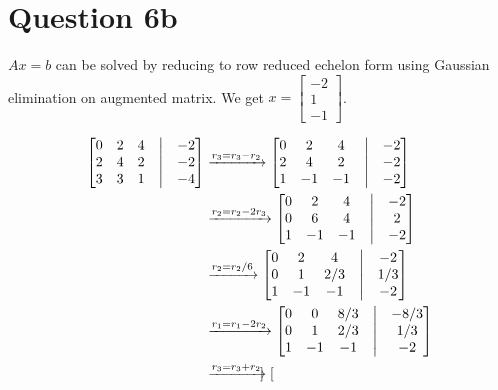 \documentclass{article}
\begin{document}
    \section*{Question 6b}
    $Ax = b$ can be solved by reducing to row reduced echelon form using Gaussian elimination on augmented matrix. We get $x = \begin{bmatrix} -2 \\ 1 \\ -1 \end{bmatrix}$.

    \begin{align*}
        \begin{bmatrix}
            0 & 2 & 4 &\bigm| & -2 \\
            2 & 4 & 2 &\bigm| & -2 \\
            3 & 3 & 1 &\bigm| & -4
        \end{bmatrix}
        &\xrightarrow{r_3 = r_3 - r_2}
        \begin{bmatrix}
            0 & 2 & 4 &\bigm| & -2 \\
            2 & 4 & 2 &\bigm| & -2 \\
            1 & -1 & -1 &\bigm| & -2
        \end{bmatrix} \\
        &\xrightarrow{r_2 = r_2 - 2r_3}
        \begin{bmatrix}
            0 & 2 & 4 &\bigm| & -2 \\
            0 & 6 & 4 &\bigm| & 2 \\
            1 & -1 & -1 &\bigm| & -2
        \end{bmatrix} \\
        &\xrightarrow{r_2 = r_2/6}
        \begin{bmatrix}
            0 & 2 & 4 &\bigm| & -2 \\
            0 & 1 & 2/3 &\bigm| & 1/3 \\
            1 & -1 & -1 &\bigm| & -2
        \end{bmatrix} \\
        &\xrightarrow{r_1 = r_1 - 2r_2}
        \begin{bmatrix}
            0 & 0 & 8/3 &\bigm| & -8/3 \\
            0 & 1 & 2/3 &\bigm| & 1/3 \\
            1 & -1 & -1 &\bigm| & -2
        \end{bmatrix} \\
        &\xrightarrow{r_3 = r_3 + r_2}
        \begin{bmatrix}

\end{bmatrix}
\end{align*}
\end{document}
